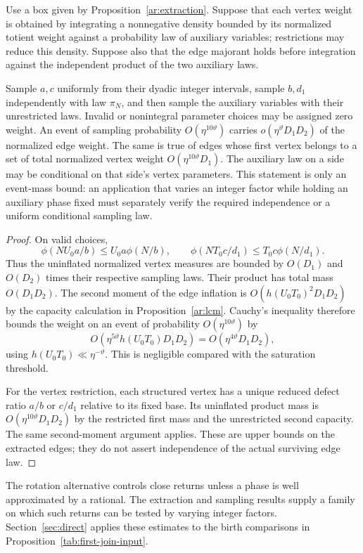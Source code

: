 \begin{corollary}
\label{ar:box-sampling}
Use a box given by Proposition~\ref{ar:extraction}. Suppose that each
vertex weight is obtained by integrating a nonnegative density bounded
by its normalized totient weight against a probability law of auxiliary
variables; restrictions may reduce this density. Suppose also that the
edge majorant holds before integration against the independent product
of the two auxiliary laws.

Sample $a,c$ uniformly from their dyadic integer intervals, sample
$b,d_1$ independently with law $\pi_N$, and then sample the auxiliary
variables with their unrestricted laws. Invalid or nonintegral parameter
choices may be assigned zero weight. An event of sampling probability
$O(\eta^{10\vartheta})$ carries
$o(\eta^\vartheta D_1D_2)$ of the normalized edge weight. The same is
true of edges whose first vertex belongs to a set of total normalized
vertex weight $O(\eta^{10\vartheta}D_1)$.
The auxiliary law on a side may be conditional on that side's vertex
parameters. This statement is only an event-mass bound: an application
that varies an integer factor while holding an auxiliary phase fixed
must separately verify the required independence or a uniform
conditional sampling law.
\end{corollary}

\begin{proof}
On valid choices,
\[
 \phi(NU_0a/b)\le U_0a\phi(N/b),\qquad
 \phi(NT_0c/d_1)\le T_0c\phi(N/d_1).
\]
Thus the uninflated normalized vertex measures are bounded by
$O(D_1)$ and $O(D_2)$ times their respective sampling laws. Their
product has total mass $O(D_1D_2)$. The second moment of the edge
inflation is $O(h(U_0T_0)^2D_1D_2)$ by the capacity calculation in
Proposition~\ref{ar:lcm}. Cauchy's inequality therefore bounds the
weight on an event of probability $O(\eta^{10\vartheta})$ by
\[
 O\left(\eta^{5\vartheta}h(U_0T_0)D_1D_2\right)
 =O(\eta^{4\vartheta}D_1D_2),
\]
using $h(U_0T_0)\ll\eta^{-\vartheta}$. This is negligible compared
with the saturation threshold.

For the vertex restriction, each structured vertex has a unique
reduced defect ratio $a/b$ or $c/d_1$ relative to its fixed base.
Its uninflated product mass is
$O(\eta^{10\vartheta}D_1D_2)$ by the restricted first mass and the
unrestricted second capacity. The same second-moment argument applies.
These are upper bounds on the extracted edges; they do not assert
independence of the actual surviving edge law.
\end{proof}

The rotation alternative controls close returns unless a phase is
well approximated by a rational. The extraction and sampling results
supply a family on which such returns can be tested by varying integer
factors. Section~\ref{sec:direct} applies these estimates to the birth
comparisons in Proposition~\ref{tab:first-join-input}.

